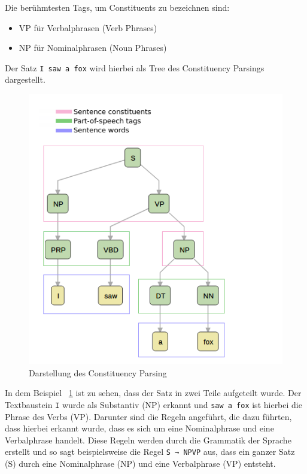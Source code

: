 Die berühmtesten Tags, um Constituents zu bezeichnen sind:

\begin{itemize}
    \item VP für Verbalphrasen (Verb Phrases)
    \item NP für Nominalphrasen (Noun Phrases)
\end{itemize}

Der Satz \texttt{I saw a fox} wird hierbei als Tree des Constituency Parsings dargestellt.

\begin{figure}[hbt!]
    \centering
    \includegraphics[scale=0.5]{pics/constituency_parse_tree}
    \caption{Darstellung des Constituency Parsing~\cite{dependencyVsConstituencyParsing}}
    \label{fig:constituency_parsing_tree}
\end{figure}

In dem Beispiel ~\ref{fig:constituency_parsing_tree} ist zu sehen, dass der Satz in zwei Teile aufgeteilt wurde.
Der Textbaustein \texttt{I} wurde als Substantiv (NP) erkannt und \texttt{saw a fox} ist hierbei die Phrase des Verbs (VP).
Darunter sind die Regeln angeführt, die dazu führten, dass hierbei erkannt wurde, dass es sich um eine Nominalphrase und eine Verbalphrase handelt.
Diese Regeln werden durch die Grammatik der Sprache erstellt und so sagt beispielsweise die Regel \texttt{S → NPVP} aus, dass ein ganzer Satz (S) durch eine Nominalphrase (NP) und eine Verbalphrase (VP) entsteht.\cite{dependencyVsConstituencyParsing}

